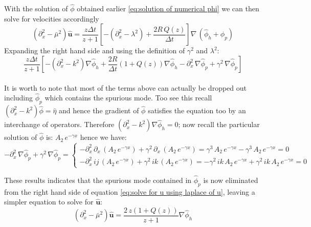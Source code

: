 With the solution of $\hat{\phi}$ obtained earlier \eqref{eq:solution of numerical phi} we can then solve for velocities accordingly
\begin{equation}\label{eq:solve for u using laplace of u}
(\partial_x^2 - \bar{\mu}^2) \hat{\textbf{u}} = \dfrac{z \Delta t}{z + 1} [- (\partial_x^2 - \lambda^2) + \dfrac{2 R \, Q(z)}{\Delta t}] \nabla \,(\hat{\phi}_h + \hat{\phi}_p)
\end{equation}
Expanding the right hand side and using the definition of $\gamma^2$ and $\lambda^2$:\\
\begin{equation*}
\dfrac{z \Delta t}{z + 1} [- (\partial_x^2 - k^2) \nabla \hat{\phi}_h + \dfrac{2R}{\Delta t}(1+Q(z)) \nabla \hat{\phi}_h - \partial_x^2\,\nabla \hat{\phi}_p + \gamma^2\,\nabla \hat{\phi}_p] 
\end{equation*}\\
It is worth to note that most of the terms above can actually be dropped out including $\hat{\phi}_p$ which contains the spurious mode. Too see this recall $(\partial_x^2 - k^2)\hat{\phi} = \hat{\eta}$ and hence the gradient of $\hat{\phi}$ satisfies the equation too by an interchange of operators. Therefore $(\partial_x^2 - k^2) \nabla \hat{\phi}_h =0$; now recall the particular solution of $\hat{\phi}$ is: $A_2 \,e^{-\gamma x}$ hence we have:\\
\begin{equation*}
- \partial_x^2\,\nabla \hat{\phi}_p + \gamma^2\,\nabla \hat{\phi}_p = 
\begin{cases}
-\partial_x^2\,\partial_x \,(A_2 \,e^{-\gamma x}) + \gamma^2\,\partial_x\,(A_2 \,e^{-\gamma x})
= \gamma^3\,A_2 \,e^{-\gamma x} - \gamma^3\,A_2 \,e^{-\gamma x} = 0\\
-\partial_x^2\,ij \,(A_2 \,e^{-\gamma x}) + \gamma^2\,ik\,(A_2 \,e^{-\gamma x})
= -\gamma^2 \,ik\,A_2 \,e^{-\gamma x} + \gamma^2\,ik\,A_2 \,e^{-\gamma x} = 0
\end{cases}
\end{equation*}

These results indicates that the spurious mode contained in $\hat{\phi}_p$ is now eliminated from the right hand side of equation \eqref{eq:solve for u using laplace of u}, leaving a simpler equation to solve for $\hat{\textbf{u}}$:
\begin{equation}
(\partial_x^2 - \bar{\mu}^2) \hat{\textbf{u}} = \dfrac{2\, z (1+ Q(z))}{z + 1} \nabla \hat{\phi}_h
\end{equation}


